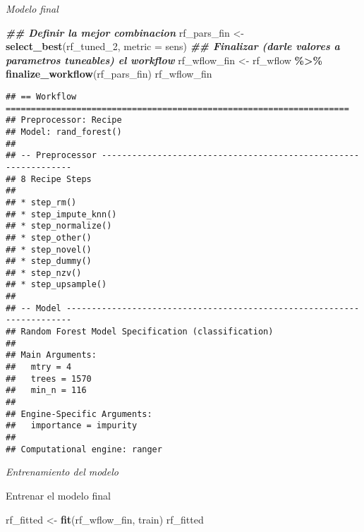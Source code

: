 \documentclass[
]{article}
\newenvironment{Shaded}{\begin{snugshade}}{\end{snugshade}}
\newcommand{\AttributeTok}[1]{\textcolor[rgb]{0.13,0.29,0.53}{#1}}
\newcommand{\DocumentationTok}[1]{\textcolor[rgb]{0.56,0.35,0.01}{\textbf{\textit{#1}}}}
\newcommand{\FunctionTok}[1]{\textcolor[rgb]{0.13,0.29,0.53}{\textbf{#1}}}
\newcommand{\NormalTok}[1]{#1}
\newcommand{\OtherTok}[1]{\textcolor[rgb]{0.56,0.35,0.01}{#1}}
\newcommand{\SpecialCharTok}[1]{\textcolor[rgb]{0.81,0.36,0.00}{\textbf{#1}}}
\newcommand{\StringTok}[1]{\textcolor[rgb]{0.31,0.60,0.02}{#1}}
\begin{document}
\emph{Modelo final}

\begin{Shaded}
\begin{Highlighting}[]
\DocumentationTok{\#\# Definir la mejor combinacion}
\NormalTok{rf\_pars\_fin }\OtherTok{\textless{}{-}} \FunctionTok{select\_best}\NormalTok{(rf\_tuned\_2, }\AttributeTok{metric =} \StringTok{\textquotesingle{}sens\textquotesingle{}}\NormalTok{)}
\DocumentationTok{\#\# Finalizar (darle valores a parametros tuneables) el workflow}
\NormalTok{rf\_wflow\_fin }\OtherTok{\textless{}{-}}
\NormalTok{rf\_wflow }\SpecialCharTok{\%\textgreater{}\%}
  \FunctionTok{finalize\_workflow}\NormalTok{(rf\_pars\_fin)}
\NormalTok{rf\_wflow\_fin}
\end{Highlighting}
\end{Shaded}

\begin{verbatim}
## == Workflow ====================================================================
## Preprocessor: Recipe
## Model: rand_forest()
## 
## -- Preprocessor ----------------------------------------------------------------
## 8 Recipe Steps
## 
## * step_rm()
## * step_impute_knn()
## * step_normalize()
## * step_other()
## * step_novel()
## * step_dummy()
## * step_nzv()
## * step_upsample()
## 
## -- Model -----------------------------------------------------------------------
## Random Forest Model Specification (classification)
## 
## Main Arguments:
##   mtry = 4
##   trees = 1570
##   min_n = 116
## 
## Engine-Specific Arguments:
##   importance = impurity
## 
## Computational engine: ranger
\end{verbatim}

\emph{Entrenamiento del modelo}

Entrenar el modelo final

\begin{Shaded}
\begin{Highlighting}[]
\NormalTok{rf\_fitted }\OtherTok{\textless{}{-}} \FunctionTok{fit}\NormalTok{(rf\_wflow\_fin, train)}
\NormalTok{rf\_fitted}
\end{Highlighting}
\end{Shaded}
\end{document}
